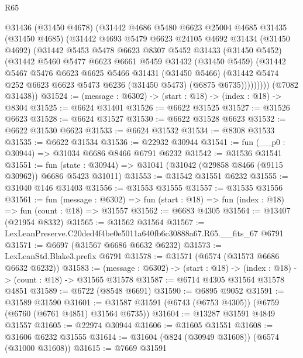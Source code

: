 \begin{lexlean}{R65}
\begin{coremodule}
{          @31436
          (@31450 @4678)
          (@31442
            @4686
            @5480
            @6623
            @25004
            @4685
            @31435
            (@31450 @4685)
            (@31442
              @4693
              @5479
              @6623
              @24105
              @4692
              @31434
              (@31450 @4692)
              (@31442
                @5453
                @5478
                @6623
                @8307
                @5452
                @31433
                (@31450 @5452)
                (@31442
                  @5460
                  @5477
                  @6623
                  @6661
                  @5459
                  @31432
                  (@31450 @5459)
                  (@31442
                    @5467
                    @5476
                    @6623
                    @6625
                    @5466
                    @31431
                    (@31450 @5466)
                    (@31442 @5474 @252 @6623 @6623 @5473 @6236 (@31450 @5473) (@6875 @6735)))))))))
      (@7082 @31438))
@31524 := (message : @6302) -> (start : @18) -> (index : @18) -> @8304
@31525 := @6624 @31401
@31526 := @6622 @31525
@31527 := @31526 @6623
@31528 := @6624 @31527
@31530 := @6622 @31528 @6623
@31532 := @6622 @31530 @6623
@31533 := @6624 @31532
@31534 := @8308 @31533
@31535 := @6622 @31534
@31536 := @22932 @30944
@31541 := fun (__p0 : @30944) => @31034 @6686 @8466 @6791 @6232
@31542 := @31536 @31541
@31551 := fun (state : @30944) => @31041 (@31042 (@29858 @8466 (@9115 @30962)) @6686 @5423 @31011)
@31553 := @31542 @31551 @6232
@31555 := @31040 @146 @31403
@31556 := @31553 @31555
@31557 := @31535 @31556
@31561 := fun (message : @6302) =>
  fun (start : @18) => fun (index : @18) => fun (count : @18) => @31557
@31562 := @6683 @4305
@31564 := @13407 (@21954 @8332)
@31565 := @31562 @31564
@31567 := LexLeanPreserve.C20ded4f4be0e5011a640fb6c30888a67.R65.__fits_67 @6791
@31571 := @6697 (@31567 @6686 @6632 @6232)
@31573 := LexLeanStd.Blake3.prefix @6791
@31578 := @31571 (@6574 (@31573 @6686 @6632 @6232))
@31583 := (message : @6302) -> (start : @18) -> (index : @18) -> (count : @18) -> @31565 @31578
@31587 := @6714 @4305 @31564 @31578 @4851
@31589 := @6722 (@8548 @6691)
@31590 := @6895 @9052
@31591 := @31589 @31590
@31601 := @31587 @31591 (@6743 (@6753 @4305)) (@6759 (@6760 (@6761 @4851) @31564 @6735))
@31604 := @13287 @31591 @4849 @31557
@31605 := @22974 @30944
@31606 := @31605 @31551
@31608 := @31606 @6232 @31555
@31614 := @31604 (@824 (@30949 @31608)) (@6574 (@31000 @31608))
@31615 := @7669 @31591
}
\end{coremodule}
\end{lexlean}
